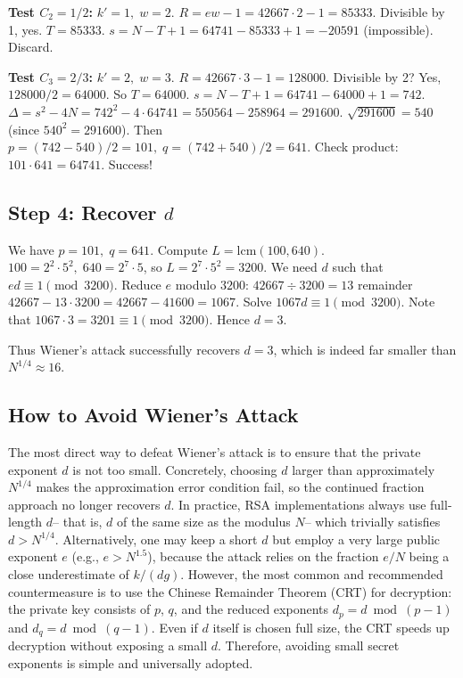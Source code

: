 \noindent\textbf{Test \(C_2 = 1/2\):} \(k'=1,\; w=2\).  
\(R = e w -1 = 42667\cdot2 -1 = 85333\). Divisible by 1, yes. \(T = 85333\).  
\(s = N - T +1 = 64741 - 85333 +1 = -20591\) (impossible). Discard.

\noindent\textbf{Test \(C_3 = 2/3\):} \(k'=2,\; w=3\).  
\(R = 42667\cdot3 -1 = 128000\). Divisible by 2? Yes, \(128000/2 = 64000\). So \(T = 64000\).  
\(s = N - T + 1 = 64741 - 64000 + 1 = 742\).  
\(\Delta = s^2 - 4N = 742^2 - 4\cdot64741 = 550564 - 258964 = 291600\).  
\(\sqrt{291600} = 540\) (since \(540^2 = 291600\)).  
Then \(p = (742-540)/2 = 101,\; q = (742+540)/2 = 641\). Check product: \(101 \cdot 641 = 64741\). Success!

\subsection*{Step 4: Recover \(d\)}
We have \(p=101,\; q=641\). Compute \(L = \mathrm{lcm}(100,640)\).  
\(100 = 2^2\cdot5^2,\; 640 = 2^7\cdot5\), so \(L = 2^7\cdot5^2 = 3200\).  
We need \(d\) such that \(e d \equiv 1 \pmod{3200}\). Reduce \(e\) modulo \(3200\):
\(42667 \div 3200 = 13\) remainder \(42667 - 13\cdot3200 = 42667 - 41600 = 1067\).  
Solve \(1067 d \equiv 1 \pmod{3200}\). Note that \(1067\cdot3 = 3201 \equiv 1 \pmod{3200}\). Hence \(d = 3\).

Thus Wiener's attack successfully recovers \(d = 3\), which is indeed far smaller than \(N^{1/4} \approx 16\).


\subsection{How to Avoid Wiener’s Attack}
The most direct way to defeat Wiener’s attack is to ensure that the private exponent \(d\) is not too small. Concretely, choosing \(d\) larger than approximately \(N^{1/4}\) makes the approximation error condition fail, so the continued fraction approach no longer recovers \(d\). In practice, RSA implementations always use full-length \(d\)-- that is, \(d\) of the same size as the modulus \(N\)-- which trivially satisfies \(d > N^{1/4}\). Alternatively, one may keep a short \(d\) but employ a very large public exponent \(e\) (e.g., \(e > N^{1.5}\)), because the attack relies on the fraction \(e/N\) being a close underestimate of \(k/(dg)\). However, the most common and recommended countermeasure is to use the Chinese Remainder Theorem (CRT) for decryption: the private key consists of \(p\), \(q\), and the reduced exponents \(d_p = d \bmod (p-1)\) and \(d_q = d \bmod (q-1)\). Even if \(d\) itself is chosen full size, the CRT speeds up decryption without exposing a small \(d\). Therefore, avoiding small secret exponents is simple and universally adopted.
